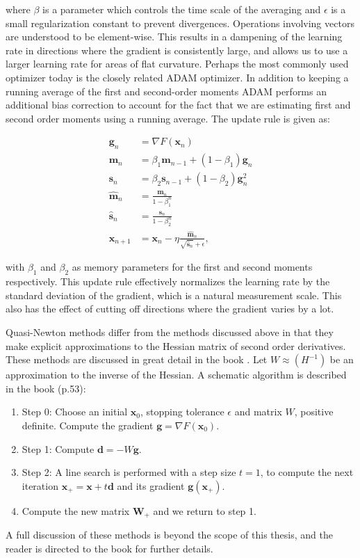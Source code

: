 where $\beta$ is a parameter which controls the time scale
of the averaging and $\epsilon$ is a small regularization constant
to prevent divergences. Operations involving vectors are understood
to be element-wise. This results in a dampening of the learning rate
in directions where the gradient is consistently large,
and allows us to use a larger learning rate for areas
of flat curvature.
Perhaps the most commonly used optimizer today is the closely
related ADAM optimizer. In addition to keeping a running average
of the first and second-order moments ADAM performs
an additional bias correction to account for the 
fact that we are estimating first and second order moments
using a running average. The update rule is given as:

\begin{equation}
    \begin{split}
        \bm{g}_n &= \nabla F(\bm{x}_n) \\
        \bm{m}_n &= \beta_1 \bm{m}_{n-1} + (1 - \beta_1)\bm{g}_n \\
        \bm{s}_n &= \beta_2 \bm{s}_{n-1} + (1 - \beta_2)\bm{g}_n^2 \\
        \hat{\bm{m}}_n &= \frac{\bm{m}_n}{1 - \beta_1^n} \\
        \hat{\bm{s}}_n &= \frac{\bm{s}_n}{1 - \beta_2^n} \\
        \bm{x}_{n+1} &= \bm{x}_n - \eta \frac{\hat{\bm{m}}_n}
        {\sqrt{\hat{\bm{s}}_n} + \epsilon} ,
    \end{split}
\end{equation}

with $\beta_1$ and $\beta_2$ as memory parameters for the first and
second moments respectively. This update rule
effectively normalizes the learning rate by the
standard deviation of the gradient, which is a natural
measurement scale. This also has the effect
of cutting off directions where the gradient varies
by a lot.
\par
Quasi-Newton methods differ from the methods discussed above
in that they make explicit approximations to the Hessian matrix
of second order derivatives. These methods are discussed in
great detail in the book \parencite[Numerical optimization: theoretical
    and practical aspects]{bonnans2006numerical}.
Let $W \approx (H^{-1})$ be an approximation to the inverse
of the Hessian. A schematic algorithm is described in the book (p.53):

\begin{enumerate}
    \item Step 0: Choose an initial $\bm{x}_0$, stopping tolerance
        $\epsilon$ and matrix $W$, positive definite.
        Compute the gradient $\bm{g} = \nabla F(\bm{x}_0)$.
    \item Step 1: Compute $\bm{d} = - W\bm{g}$.
    \item Step 2: A line search is performed with a step size
        $t = 1$, to compute the next iteration
        $\bm{x}_{+} = \bm{x} + t\bm{d}$ and its gradient $\bm{g}(\bm{x}_{+})$.
    \item Compute the new matrix $\bm{W}_{+}$ and we return to step 1.
\end{enumerate}

A full discussion of these methods is beyond the scope of this thesis,
and the reader is directed to the book \cite{bonnans2006numerical}
for further details.
